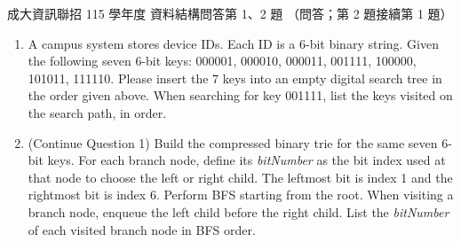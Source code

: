 \begin{pastexam}[label={px:ncku-115-prog-01}]{成大資訊聯招 115 學年度 資料結構問答第 1、2 題}
（問答；第 2 題接續第 1 題）

\begin{enumerate}
\item[1.] [3\%] A campus system stores device IDs. Each ID is a 6-bit binary string. Given the following
seven 6-bit keys: 000001, 000010, 000011, 001111, 100000, 101011, 111110. Please insert the 7 keys into
an empty digital search tree in the order given above. When searching for key 001111, list the keys
visited on the search path, in order.\par\smallskip
{}\par\smallskip

\item[2.] [4\%] (Continue Question 1) Build the compressed binary trie for the same seven 6-bit keys.
For each branch node, define its \textit{bitNumber} as the bit index used at that node to choose the
left or right child. The leftmost bit is index 1 and the rightmost bit is index 6. Perform BFS starting
from the root. When visiting a branch node, enqueue the left child before the right child. List the
\textit{bitNumber} of each visited branch node in BFS order.\par\smallskip
{}
\end{enumerate}
\end{pastexam}

